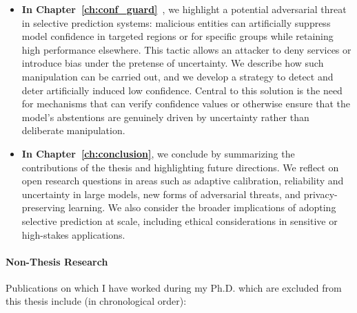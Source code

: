 \begin{itemize}
    \item \textbf{In Chapter~\ref{ch:conf_guard}}~\citep{rabanser2025confidential}, we highlight a potential adversarial threat in selective prediction systems: malicious entities can artificially suppress model confidence in targeted regions or for specific groups while retaining high performance elsewhere. This tactic allows an attacker to deny services or introduce bias under the pretense of uncertainty. We describe how such manipulation can be carried out, and we develop a strategy to detect and deter artificially induced low confidence. Central to this solution is the need for mechanisms that can verify confidence values or otherwise ensure that the model's abstentions are genuinely driven by uncertainty rather than deliberate manipulation.

    \item \textbf{In Chapter~\ref{ch:conclusion}}, we conclude by summarizing the contributions of the thesis and highlighting future directions. We reflect on open research questions in areas such as adaptive calibration, reliability and uncertainty in large models, new forms of adversarial threats, and privacy-preserving learning. We also consider the broader implications of adopting selective prediction at scale, including ethical considerations in sensitive or high-stakes applications.
\end{itemize}

\paragraph{Non-Thesis Research} Publications on which I have worked during my Ph.D. which are excluded from this thesis include (in chronological order):

